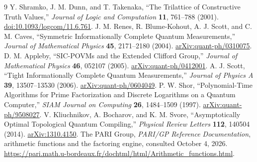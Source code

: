 \documentclass[12pt]{article}
\begin{document}
\begin{thebibliography}{9}
 Y. Shramko, J. M. Dunn, and T. Takenaka, ``The Trilattice of Constructive Truth Values,'' \emph{Journal of Logic and Computation} \textbf{11}, 761--788 (2001). \href{https://doi.org/10.1093/logcom/11.6.761}{doi:10.1093/logcom/11.6.761}.
 J. M. Renes, R. Blume-Kohout, A. J. Scott, and C. M. Caves, ``Symmetric Informationally Complete Quantum Measurements,'' \emph{Journal of Mathematical Physics} \textbf{45}, 2171--2180 (2004). \href{https://arxiv.org/abs/quant-ph/0310075}{arXiv:quant-ph/0310075}.
 D. M. Appleby, ``SIC-POVMs and the Extended Clifford Group,'' \emph{Journal of Mathematical Physics} \textbf{46}, 052107 (2005). \href{https://arxiv.org/abs/quant-ph/0412001}{arXiv:quant-ph/0412001}.
 A. J. Scott, ``Tight Informationally Complete Quantum Measurements,'' \emph{Journal of Physics A} \textbf{39}, 13507--13530 (2006). \href{https://arxiv.org/abs/quant-ph/0604049}{arXiv:quant-ph/0604049}.
 P. W. Shor, ``Polynomial-Time Algorithms for Prime Factorization and Discrete Logarithms on a Quantum Computer,'' \emph{SIAM Journal on Computing} \textbf{26}, 1484--1509 (1997). \href{https://arxiv.org/abs/quant-ph/9508027}{arXiv:quant-ph/9508027}.
 V. Kliuchnikov, A. Bocharov, and K. M. Svore, ``Asymptotically Optimal Topological Quantum Compiling,'' \emph{Physical Review Letters} \textbf{112}, 140504 (2014). \href{https://arxiv.org/abs/1310.4150}{arXiv:1310.4150}.
 The PARI Group, \emph{PARI/GP Reference Documentation}, arithmetic functions and the factoring engine, consulted October 4, 2026. \url{https://pari.math.u-bordeaux.fr/dochtml/html/Arithmetic_functions.html}.
\end{thebibliography}
\end{document}
